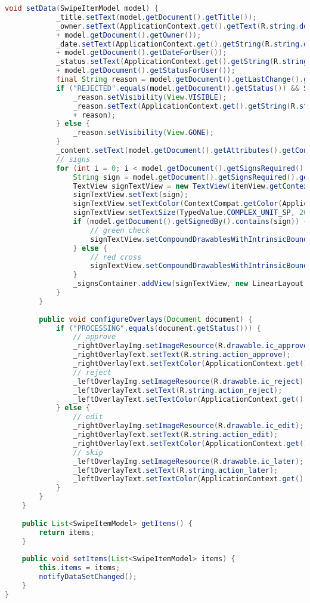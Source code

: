 \begin{lstlisting}[language=Java]
		void setData(SwipeItemModel model) {
			_title.setText(model.getDocument().getTitle());
			_owner.setText(ApplicationContext.get().getText(R.string.doc_owner_prefix) + " "
			+ model.getDocument().getOwner());
			_date.setText(ApplicationContext.get().getString(R.string.doc_date_prefix) + " "
			+ model.getDocument().getDateForUser());
			_status.setText(ApplicationContext.get().getString(R.string.doc_status_prefix) + " "
			+ model.getDocument().getStatusForUser());
			final String reason = model.getDocument().getLastChange().getDetails();
			if ("REJECTED".equals(model.getDocument().getStatus()) && StringUtils.isNotEmpty(reason)) {
				_reason.setVisibility(View.VISIBLE);
				_reason.setText(ApplicationContext.get().getString(R.string.doc_reject_reason) + " "
				+ reason);
			} else {
				_reason.setVisibility(View.GONE);
			}
			_content.setText(model.getDocument().getAttributes().getContent());
			// signs
			for (int i = 0; i < model.getDocument().getSignsRequired().size(); i++) {
				String sign = model.getDocument().getSignsRequired().get(i);
				TextView signTextView = new TextView(itemView.getContext());
				signTextView.setText(sign);
				signTextView.setTextColor(ContextCompat.getColor(ApplicationContext.get(), R.color.colorFullBlack));
				signTextView.setTextSize(TypedValue.COMPLEX_UNIT_SP, 20);
				if (model.getDocument().getSignedBy().contains(sign)) {
					// green check
					signTextView.setCompoundDrawablesWithIntrinsicBounds(R.drawable.ic_approve_small, 0, 0, 0);
				} else {
					// red cross
					signTextView.setCompoundDrawablesWithIntrinsicBounds(R.drawable.ic_reject_small, 0, 0, 0);
				}
				_signsContainer.addView(signTextView, new LinearLayout.LayoutParams(LinearLayout.LayoutParams.WRAP_CONTENT, LinearLayout.LayoutParams.WRAP_CONTENT));
			}
		}
		
		public void configureOverlays(Document document) {
			if ("PROCESSING".equals(document.getStatus())) {
				// approve
				_rightOverlayImg.setImageResource(R.drawable.ic_approve);
				_rightOverlayText.setText(R.string.action_approve);
				_rightOverlayText.setTextColor(ApplicationContext.get().getResources().getColor(R.color.color_green));
				// reject
				_leftOverlayImg.setImageResource(R.drawable.ic_reject);
				_leftOverlayText.setText(R.string.action_reject);
				_leftOverlayText.setTextColor(ApplicationContext.get().getResources().getColor(R.color.color_red));
			} else {
				// edit
				_rightOverlayImg.setImageResource(R.drawable.ic_edit);
				_rightOverlayText.setText(R.string.action_edit);
				_rightOverlayText.setTextColor(ApplicationContext.get().getResources().getColor(R.color.grey));
				// skip
				_leftOverlayImg.setImageResource(R.drawable.ic_later);
				_leftOverlayText.setText(R.string.action_later);
				_leftOverlayText.setTextColor(ApplicationContext.get().getResources().getColor(R.color.grey));
			}
		}
	}
	
	public List<SwipeItemModel> getItems() {
		return items;
	}
	
	public void setItems(List<SwipeItemModel> items) {
		this.items = items;
		notifyDataSetChanged();
	}
}

\end{lstlisting}
